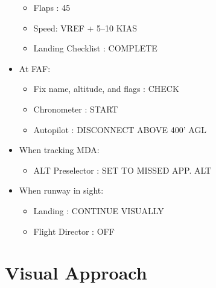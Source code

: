 \begin{itemize}
\begin{itemize}
\item Flaps : 45

\item Speed: VREF + 5--10 KIAS

\item Landing Checklist : COMPLETE

\end{itemize}

\item At FAF:

\begin{itemize}
\item Fix name, altitude, and flags : CHECK

\item Chronometer : START

\item Autopilot : DISCONNECT ABOVE 400' AGL

\end{itemize}

\item When tracking MDA:

\begin{itemize}
\item ALT Preselector : SET TO MISSED APP. ALT

\end{itemize}

\item When runway in sight:

\begin{itemize}
\item Landing : CONTINUE VISUALLY

\item Flight Director : OFF

\end{itemize}

\end{itemize}

\section{Visual Approach}
\label{visualapproach}

